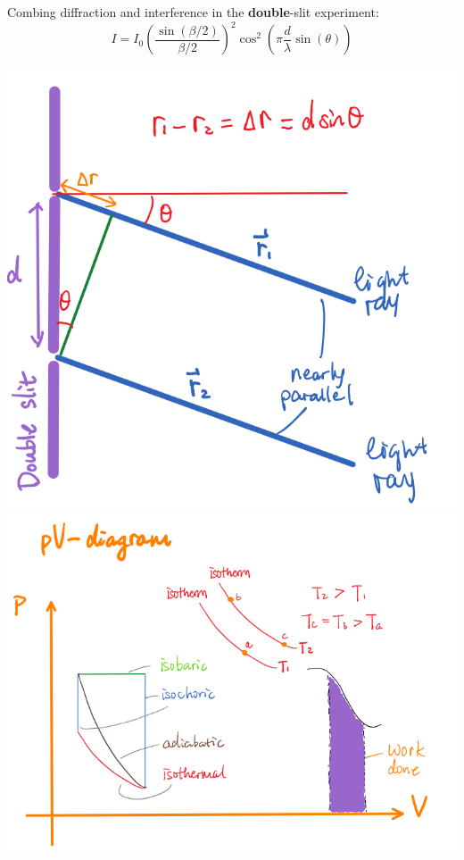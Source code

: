 \documentclass[10pt]{article}
\theoremstyle{break}
\theoremstyle{break}
\begin{document}
Combing diffraction and interference in the \textbf{double}-slit experiment:
$$I = I_0 \left(\frac{\sin(\beta/2)}{\beta/2} \right)^2 \cos^2\left(\pi \frac{d}{\lambda} \sin(\theta)\right)$$
\hfill\break
\begin{center}
\includegraphics[scale=0.3]{slits.png}\qquad\qquad\qquad
\includegraphics[scale=0.39]{thermo.png}
\end{center}
\end{document}
